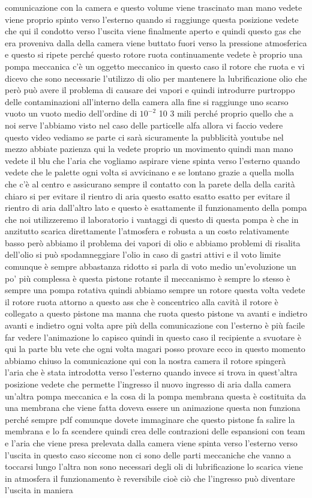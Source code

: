 comunicazione con la camera e questo volume viene trascinato man mano vedete viene proprio spinto verso l'esterno quando si raggiunge questa posizione vedete che qui il condotto verso l'uscita viene finalmente aperto e quindi questo gas che era proveniva dalla della camera viene buttato fuori verso la pressione atmosferica e questo si ripete perché questo rotore ruota continuamente vedete è proprio una pompa meccanica c'è un oggetto meccanico in questo caso il rotore che ruota e vi dicevo che sono necessarie l'utilizzo di olio per mantenere la lubrificazione olio che però può avere il problema di causare dei vapori e quindi introdurre purtroppo delle contaminazioni all'interno della camera alla fine si raggiunge uno scarso vuoto un vuoto medio dell'ordine di $10^{-2}$ 10 3 mili perché proprio quello che a noi serve l'abbiamo visto nel caso delle particelle alfa allora vi faccio vedere questo video vediamo se parte ci sarà sicuramente la pubblicità youtube nel mezzo abbiate pazienza qui la vedete proprio un movimento quindi man mano vedete il blu che l'aria che vogliamo aspirare viene spinta verso l'esterno quando vedete che le palette ogni volta si avvicinano e se lontano grazie a quella molla che c'è al centro e assicurano sempre il contatto con la parete della della carità chiaro si per evitare il rientro di aria questo esatto esatto esatto per evitare il rientro di aria dall'altro lato e questo è esattamente il funzionamento della pompa che noi utilizzeremo il laboratorio i vantaggi di questo di questa pompa è che in anzitutto scarica direttamente l'atmosfera e robusta a un costo relativamente basso però abbiamo il problema dei vapori di olio e abbiamo problemi di risalita dell'olio si può spodamneggiare l'olio in caso di gastri attivi e il voto limite comunque è sempre abbastanza ridotto si parla di voto medio un'evoluzione un po' più complessa è questa pistone rotante il meccanismo è sempre lo stesso è sempre una pompa rotativa quindi abbiamo sempre un rotore questa volta vedete il rotore ruota attorno a questo ass che è concentrico alla cavità il rotore è collegato a questo pistone ma manna che ruota questo pistone va avanti e indietro avanti e indietro ogni volta apre più della comunicazione con l'esterno è più facile far vedere l'animazione lo capisco quindi in questo caso il recipiente a svuotare è qui la parte blu vete che ogni volta magari posso provare ecco in questo momento abbiamo chiuso la comunicazione qui con la nostra camera il rotore spingerà l'aria che è stata introdotta verso l'esterno quando invece si trova in quest'altra posizione vedete che permette l'ingresso il nuovo ingresso di aria dalla camera un'altra pompa meccanica e la cosa di la pompa membrana questa è costituita da una membrana che viene fatta doveva essere un animazione questa non funziona perché sempre pdf comunque dovete immaginare che questo pistone fa salire la membrana e lo fa scendere quindi crea delle contrazioni delle espansioni con team e l'aria che viene presa prelevata dalla camera viene spinta verso l'esterno verso l'uscita in questo caso siccome non ci sono delle parti meccaniche che vanno a toccarsi lungo l'altra non sono necessari degli oli di lubrificazione lo scarica viene in atmosfera il funzionamento è reversibile cioè ciò che l'ingresso può diventare l'uscita in maniera 